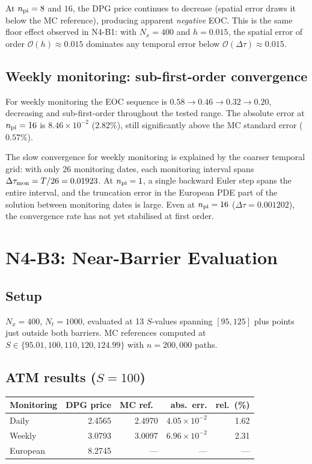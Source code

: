 \documentclass[11pt,a4paper]{article}
\newcommand{\Nx}{N_x}
\newcommand{\Nt}{N_t}
\newcommand{\npi}{n_{\rm pi}}
\newcommand{\bigo}[1]{\mathcal{O}(#1)}
\begin{document}
At $\npi = 8$ and $16$, the DPG price continues to decrease (spatial
error draws it below the MC reference), producing apparent \emph{negative}
EOC.  This is the same floor effect observed in N4-B1: with $\Nx = 400$
and $h = 0.015$, the spatial error of order $\bigo{h} \approx 0.015$
dominates any temporal error below $\bigo{\Delta\tau} \approx 0.015$.

\subsection{Weekly monitoring: sub-first-order convergence}

For weekly monitoring the EOC sequence is $0.58 \to 0.46 \to 0.32 \to 0.20$,
decreasing and sub-first-order throughout the tested range.  The absolute
error at $\npi = 16$ is $8.46\times10^{-2}$ ($2.82\%$), still significantly
above the MC standard error ($0.57\%$).

The slow convergence for weekly monitoring is explained by the coarser
temporal grid: with only 26 monitoring dates, each monitoring interval
spans $\Delta\tau_{\rm mon} = T/26 = 0.01923$.  At $\npi = 1$, a single
backward Euler step spans the entire interval, and the truncation error
in the European PDE part of the solution between monitoring dates is
large.  Even at $\npi = 16$ ($\Delta\tau = 0.001202$), the convergence
rate has not yet stabilised at first order.

\section{N4-B3: Near-Barrier Evaluation}
\label{sec:nearbarrier}

\subsection{Setup}

$\Nx = 400$, $\Nt = 1000$, evaluated at 13 $S$-values spanning
$[95, 125]$ plus points just outside both barriers.  MC references
computed at $S \in \{95.01, 100, 110, 120, 124.99\}$ with
$n = 200{,}000$ paths.

\subsection{ATM results ($S = 100$)}

\begin{center}
\begin{tabular}{lrrrr}
\toprule
Monitoring & DPG price & MC ref.\ & abs.\ err. & rel.\ (\%) \\
\midrule
Daily    & 2.4565 & 2.4970 & $4.05\times10^{-2}$ & 1.62 \\
Weekly   & 3.0793 & 3.0097 & $6.96\times10^{-2}$ & 2.31 \\
European & 8.2745 & --- & --- & --- \\
\bottomrule
\end{tabular}
\end{center}
\end{document}
